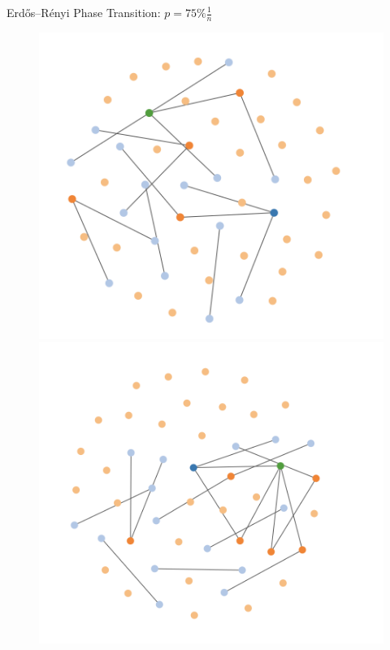 \documentclass[aspectratio=169, handout]{beamer}
\begin{document}
\begin{frame}{Erdős–Rényi Phase Transition: $p = 75\% \frac{1}{n}$}
\begin{figure}
\centering
\includegraphics[scale=0.22]{images/percolation-2-1.png}
\includegraphics[scale=0.22]{images/percolation-2-2.png}

\end{figure}
\end{frame}
\end{document}
